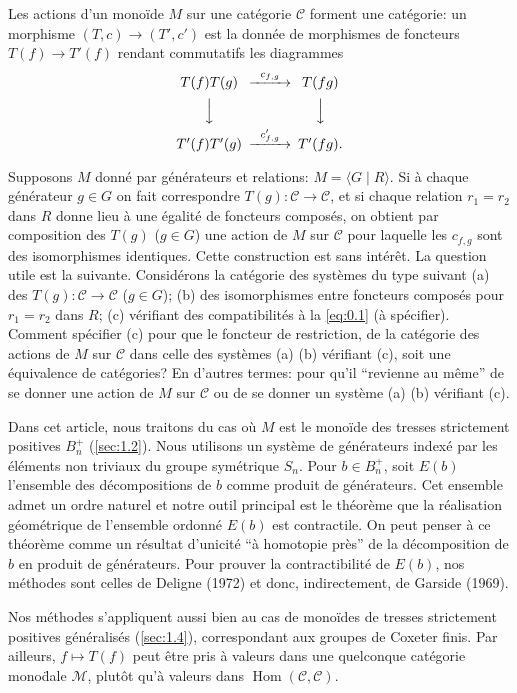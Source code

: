 \documentclass[11pt,a4paper]{article}
\theoremstyle{plain}
\theoremstyle{definition}
\DeclareMathOperator{\Hom}{Hom}
\newcommand{\cC}{\mathscr{C}}
\newcommand{\cM}{\mathscr{M}}
\begin{document}
Les actions d'un mono\"ide $M$ sur une cat\'egorie $\cC$ forment une cat\'egorie: un morphisme $(T,c) \to (T',c')$ est la donn\'ee de morphismes de foncteurs $T(f) \to T'(f)$ rendant commutatifs les diagrammes
\[
\begin{CD}
T(f)T(g) @>{c_{f,g}}>> T(fg) \\
@VVV @VVV \\
T'(f)T'(g) @>{c'_{f,g}}>> T'(fg).
\end{CD}
\]

Supposons $M$ donn\'e par g\'en\'erateurs et relations: $M = \langle G \mid R \rangle$. Si \`a chaque g\'en\'erateur $g \in G$ on fait correspondre $T(g) : \cC \to \cC$, et si chaque relation $r_1 = r_2$ dans $R$ donne lieu \`a une \'egalit\'e de foncteurs compos\'es, on obtient par composition des $T(g)$ ($g \in G$) une action de $M$ sur $\cC$ pour laquelle les $c_{f,g}$ sont des isomorphismes identiques. Cette construction est sans int\'er\^et. La question utile est la suivante. Consid\'erons la cat\'egorie des syst\`emes du type suivant (a) des $T(g) : \cC \to \cC$ ($g \in G$); (b) des isomorphismes entre foncteurs compos\'es pour $r_1 = r_2$ dans $R$; (c) v\'erifiant des compatibilit\'es \`a la \eqref{eq:0.1} (\`a sp\'ecifier). Comment sp\'ecifier (c) pour que le foncteur de restriction, de la cat\'egorie des actions de $M$ sur $\cC$ dans celle des syst\`emes (a) (b) v\'erifiant (c), soit une \'equivalence de cat\'egories? En d'autres termes: pour qu'il ``revienne au m\^eme'' de se donner une action de $M$ sur $\cC$ ou de se donner un syst\`eme (a) (b) v\'erifiant (c).

Dans cet article, nous traitons du cas o\`u $M$ est le mono\"ide des tresses strictement positives $B_n^+$ (\ref{sec:1.2}). Nous utilisons un syst\`eme de g\'en\'erateurs index\'e par les \'el\'ements non triviaux du groupe sym\'etrique $S_n$. Pour $b \in B_n^+$, soit $E(b)$ l'ensemble des d\'ecompositions de $b$ comme produit de g\'en\'erateurs. Cet ensemble admet un ordre naturel et notre outil principal est le th\'eor\`eme que la r\'ealisation g\'eom\'etrique de l'ensemble ordonn\'e $E(b)$ est contractile. On peut penser \`a ce th\'eor\`eme comme un r\'esultat d'unicit\'e ``\`a homotopie pr\`es'' de la d\'ecomposition de $b$ en produit de g\'en\'erateurs. Pour prouver la contractibilit\'e de $E(b)$, nos m\'ethodes sont celles de Deligne (1972) et donc, indirectement, de Garside (1969).

Nos m\'ethodes s'appliquent aussi bien au cas de mono\"ides de tresses strictement positives g\'en\'eralis\'es (\ref{sec:1.4}), correspondant aux groupes de Coxeter finis. Par ailleurs, $f \mapsto T(f)$ peut \^etre pris \`a valeurs dans une quelconque cat\'egorie mono\"dale $\cM$, plut\^ot qu'\`a valeurs dans $\Hom(\cC, \cC)$.
\end{document}
